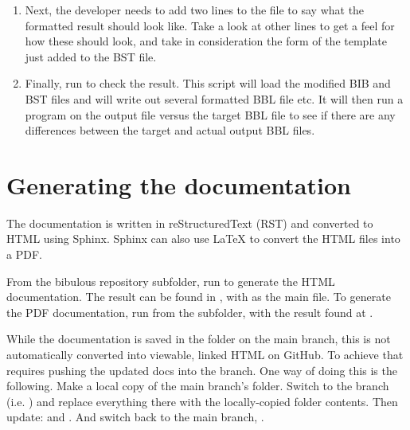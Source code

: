 \documentclass[letterpaper,10pt,english]{sphinxmanual}
\begin{document}
\begin{enumerate}
\item {} 
Next, the developer needs to add two lines to the  file to say what the formatted result should look like. Take a look at other lines to get a feel for how these should look, and take in consideration the form of the template just added to the BST file.

\item {} 
Finally, run  to check the result. This script will load the modified BIB and BST files and will write out several formatted BBL file  etc. It will then run a  program on the output file versus the target BBL file to see if there are any differences between the target and actual output BBL files.

\end{enumerate}


\section{Generating the documentation}
\label{\detokenize{developer_guide:generating-the-documentation}}
The documentation is written in reStructuredText (RST) and converted to HTML using Sphinx. Sphinx can also use LaTeX to convert the HTML files into a PDF.

From the bibulous repository  subfolder, run  to generate the HTML documentation. The result can be found in , with  as the main file. To generate the PDF documentation, run  from the  subfolder, with the result found at .

While the documentation is saved in the  folder on the main branch, this is not automatically converted into viewable, linked HTML on GitHub. To achieve that requires pushing the updated docs into the  branch. One way of doing this is the following. Make a local copy of the main branch’s  folder. Switch to the  branch (i.e. ) and replace everything there with the locally-copied  folder contents. Then update:  and . And switch back to the main branch, .
\end{document}
